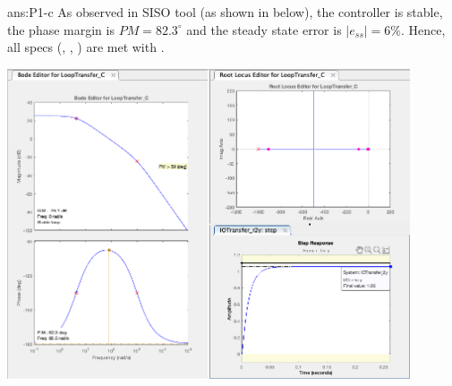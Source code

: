 \documentclass{tron}
\begin{document}
\begin{answer}{ans:P1-c}
	As observed in SISO tool (as shown in  below), the controller is stable, the phase margin is $PM=82.3^\circ$ and the steady state error is $|e_{ss}| = 6\%$. Hence, all specs (, , ) are met with .
	
	{	
		\centering
		\includegraphics[width=450px]{Fig/sisotool-c1.png}
    }
	
\end{answer}
\end{document}
